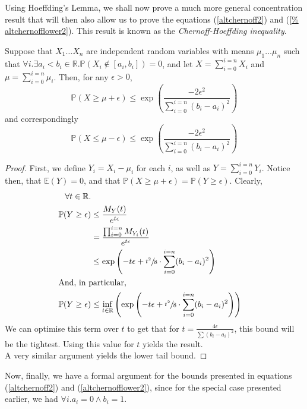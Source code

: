 	Using Hoeffding's Lemma, we shall now prove a much more general concentration result that 
	will then also allow us to prove the equations (\ref{altchernoff2}) and (\ref{%
	altchernofflower2}). This result is known as the \emph{Chernoff-Hoeffding inequality}.
	\begin{theorem}
		\label{theorem:chernoff-hoeffding}
		Suppose that $X_{1}\hdots X_n$ are independent random variables with means 
		$\mu_1\hdots\mu_n$ such that $\forall i. \exists a_i < b_i \in \mathbb{R} . 
		\mathbb{P}(X_i \notin [a_i,b_i]) = 0$, and let $X = \sum_{i=0}^{i=n} X_i$ and 
		$\mu = \sum_{i=0}^{i=n} \mu_i$. Then, for any $\epsilon > 0$,
		$$
			\mathbb{P}(X \geq \mu + \epsilon) \leq \exp\left(\frac{-2\epsilon^2}{
			\sum_{i=0}^{i=n} (b_i-a_i)^2}\right)
		$$
		and correspondingly
		$$
			\mathbb{P}(X \leq \mu - \epsilon) \leq \exp\left(\frac{-2\epsilon^2}{
			\sum_{i=0}^{i=n} (b_i-a_i)^2}\right)
		$$
	\end{theorem}
	\begin{proof}
		First, we define $Y_i = X_i - \mu_i$ for each $i$, as well as $Y=\sum_{i=0}^{i=n} 
		Y_i$. Notice then, that $\mathbb{E}(Y) = 0$, and that $\mathbb{P}(X \geq \mu + 
		\epsilon) = \mathbb{P}(Y \geq \epsilon)$. Clearly, 
		\begin{align*}
			\forall t \in \mathbb{R} . \\
			\mathbb{P}(Y \geq \epsilon) &\leq \frac{M_Y(t)}{e^{t\epsilon}} \\
			&= \frac{\prod_{i=0}^{i=n}M_{Y_i}(t)}{e^{t\epsilon}} \\
			&\leq \exp\left(-t\epsilon+\sfrac{t^2}{8}\cdot\sum_{i=0}^{i=n}(b_i-a_i)^2
			\right) \\
		\intertext{And, in particular,}
			\mathbb{P}(Y \geq \epsilon) &\leq \inf_{t\in \mathbb{R}}\left(\exp\left(
			-t\epsilon+\sfrac{t^2}{8}\cdot\sum_{i=0}^{i=n}(b_i-a_i)^2\right)\right)
		\end{align*}
		We can optimise this term over $t$ to get that for $t=\frac{4\epsilon}{
		\sum(b_i-a_i)^2}$, this bound will be the tightest. Using this value for $t$ yields 
		the result. \\
		A very similar argument yields the lower tail bound.
	\end{proof}

	Now, finally, we have a formal argument for the bounds presented in equations 
	(\ref{altchernoff2}) and (\ref{altchernofflower2}), since for the special case presented 
	earlier, we had $\forall i. a_i = 0 \land b_i = 1$.

